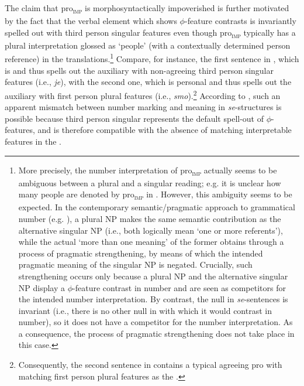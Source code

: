 \documentclass[output=paper,nonflat,newtxmath]{langsci/langscibook}
\begin{document}
 \noindent The claim that pro\textsubscript{\textsc{imp}} is morphosyntactically impoverished is further motivated by the fact that the verbal element which shows $\phi$-feature contrasts is invariantly spelled out with third person singular features even though pro\textsubscript{\textsc{imp}} typically has a plural interpretation glossed as `people' (with a contextually determined person reference) in the translations.\footnote{More precisely, the number interpretation of pro\textsubscript{\textsc{imp}} actually seems to be ambiguous between a plural and a singular reading; e.g. it is unclear how many people are denoted by pro\textsubscript{\textsc{imp}} in . However, this ambiguity  seems to be expected. In  the contemporary semantic/pragmatic approach to grammatical number (e.g. \citealt{sauerland2005}), a plural NP makes the same semantic contribution as the alternative singular NP (i.e., both logically mean `one or more referents'), while the actual `more than one meaning' of the former obtains through a process of pragmatic strengthening, by means of which the  intended pragmatic meaning of the singular NP is negated. Crucially, such strengthening occurs only because a plural NP and the alternative singular NP display a $\phi$-feature contrast in number and are seen as competitors for the intended number interpretation.  By contrast, the null  in   \textit{se}-sentences is invariant (i.e., there is no other null   in  with which it would contrast in number), so it does not have a competitor for the number interpretation. As a consequence, the process of pragmatic strengthening does not take place in this case.} Compare, for instance,  the first sentence in , which is  and thus spells out the auxiliary with non-agreeing third person singular features (i.e., \textit{je}), with the second one, which is personal and thus spells out the auxiliary with first person plural features (i.e., \textit{smo}).\footnote{Consequently, the second sentence in  contains a typical agreeing pro with matching first person plural features as the .} According to \citet{ackema2013}, such an apparent mismatch between number marking and meaning in  \textit{se}-structures is possible because third person singular represents the default spell-out of $\phi$-features,  and is therefore compatible with the absence of matching interpretable features in the .
\end{document}
